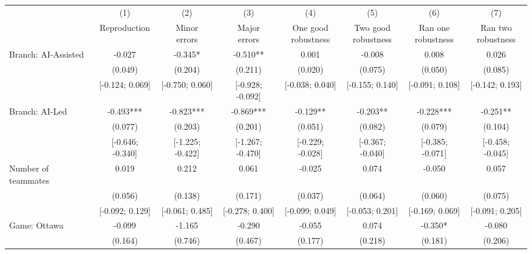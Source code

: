 \def\sym#1{\ifmmode^{#1}\else\(^{#1}\)\fi}
\begin{tabular}{l*{7}{c}}
\hline\hline
& (1) & (2) & (3) & (4) & (5) & (6) & (7)\\
                    &Reproduction   &\shortstack[c]{Minor\\errors}   &\shortstack[c]{Major\\errors}   &\shortstack[c]{One good\\robustness}   &\shortstack[c]{Two good\\robustness}   &\shortstack[c]{Ran one\\robustness}   &\shortstack[c]{Ran two\\robustness}   \\
\hline
Branch: AI-Assisted &      -0.027   &      -0.345*  &      -0.510** &       0.001   &      -0.008   &       0.008   &       0.026   \\
                    &     (0.049)   &     (0.204)   &     (0.211)   &     (0.020)   &     (0.075)   &     (0.050)   &     (0.085)   \\
                    &[-0.124; 0.069]   &[-0.750; 0.060]   &[-0.928; -0.092]   &[-0.038; 0.040]   &[-0.155; 0.140]   &[-0.091; 0.108]   &[-0.142; 0.193]   \\
Branch: AI-Led      &      -0.493***&      -0.823***&      -0.869***&      -0.129** &      -0.203** &      -0.228***&      -0.251** \\
                    &     (0.077)   &     (0.203)   &     (0.201)   &     (0.051)   &     (0.082)   &     (0.079)   &     (0.104)   \\
                    &[-0.646; -0.340]   &[-1.225; -0.422]   &[-1.267; -0.470]   &[-0.229; -0.028]   &[-0.367; -0.040]   &[-0.385; -0.071]   &[-0.458; -0.045]   \\
Number of teammates &       0.019   &       0.212   &       0.061   &      -0.025   &       0.074   &      -0.050   &       0.057   \\
                    &     (0.056)   &     (0.138)   &     (0.171)   &     (0.037)   &     (0.064)   &     (0.060)   &     (0.075)   \\
                    &[-0.092; 0.129]   &[-0.061; 0.485]   &[-0.278; 0.400]   &[-0.099; 0.049]   &[-0.053; 0.201]   &[-0.169; 0.069]   &[-0.091; 0.205]   \\
Game: Ottawa        &      -0.099   &      -1.165   &      -0.290   &      -0.055   &       0.074   &      -0.350*  &      -0.080   \\
                    &     (0.164)   &     (0.746)   &     (0.467)   &     (0.177)   &     (0.218)   &     (0.181)   &     (0.206)   \\

\end{tabular}
